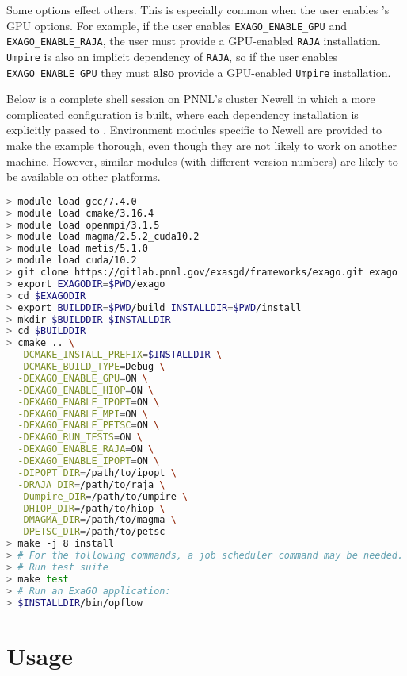 Some \cmake options effect others.
This is especially common when the user enables \exago's GPU options.
For example, if the user enables \texttt{EXAGO\_ENABLE\_GPU} and \texttt{EXAGO\_ENABLE\_RAJA}, the user must provide a GPU-enabled \texttt{RAJA} installation.
\texttt{Umpire} is also an implicit dependency of \texttt{RAJA}, so if the user enables \texttt{EXAGO\_ENABLE\_GPU} they must \textbf{also} provide a GPU-enabled \texttt{Umpire} installation.

Below is a complete shell session on PNNL's cluster Newell in which a more complicated \exago configuration is built, where each dependency installation is explicitly passed to \cmake.
Environment modules specific to Newell are provided to make the example
thorough, even though they are not likely to work on another machine. However,
similar modules (with different version numbers) are likely to be available on
other platforms.

\begin{lstlisting}[language=bash,caption={\exago build with all options enabled}]
> module load gcc/7.4.0
> module load cmake/3.16.4
> module load openmpi/3.1.5
> module load magma/2.5.2_cuda10.2
> module load metis/5.1.0
> module load cuda/10.2
> git clone https://gitlab.pnnl.gov/exasgd/frameworks/exago.git exago
> export EXAGODIR=$PWD/exago
> cd $EXAGODIR
> export BUILDDIR=$PWD/build INSTALLDIR=$PWD/install
> mkdir $BUILDDIR $INSTALLDIR
> cd $BUILDDIR
> cmake .. \
  -DCMAKE_INSTALL_PREFIX=$INSTALLDIR \
  -DCMAKE_BUILD_TYPE=Debug \
  -DEXAGO_ENABLE_GPU=ON \
  -DEXAGO_ENABLE_HIOP=ON \
  -DEXAGO_ENABLE_IPOPT=ON \
  -DEXAGO_ENABLE_MPI=ON \
  -DEXAGO_ENABLE_PETSC=ON \
  -DEXAGO_RUN_TESTS=ON \
  -DEXAGO_ENABLE_RAJA=ON \
  -DEXAGO_ENABLE_IPOPT=ON \
  -DIPOPT_DIR=/path/to/ipopt \
  -DRAJA_DIR=/path/to/raja \
  -Dumpire_DIR=/path/to/umpire \
  -DHIOP_DIR=/path/to/hiop \
  -DMAGMA_DIR=/path/to/magma \
  -DPETSC_DIR=/path/to/petsc
> make -j 8 install
> # For the following commands, a job scheduler command may be needed.
> # Run test suite
> make test
> # Run an ExaGO application:
> $INSTALLDIR/bin/opflow
\end{lstlisting}

\section{Usage}

